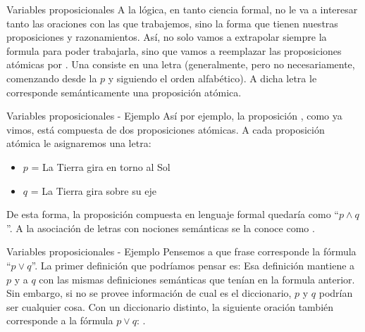 \begin{frame}{Variables proposicionales}
  A la lógica, en tanto ciencia formal, no le va a interesar tanto las oraciones
  con las que trabajemos, sino la forma que tienen nuestras proposiciones y
  razonamientos.
  \jump
  Así, no solo vamos a extrapolar siempre la formula para poder trabajarla, sino
  que vamos a reemplazar las proposiciones atómicas por .
  \jump
  Una  consiste en una letra (generalmente, pero
  no necesariamente, comenzando desde la $p$ y siguiendo el orden alfabético). A
  dicha letra le corresponde semánticamente una proposición atómica.
\end{frame}


\begin{frame}{Variables proposicionales - Ejemplo}
  Así por ejemplo, la proposición , como ya vimos, está compuesta de dos
  proposiciones atómicas. A cada proposición atómica le asignaremos una letra:
  \jump
  \begin{itemize}
    \item $p$ = La Tierra gira en torno al Sol
    \item $q$ = La Tierra gira sobre su eje
  \end{itemize}
  \jump
  De esta forma, la proposición compuesta en lenguaje formal quedaría como
  ``$p \land q$''.
  \jump
  A la asociación de letras con nociones semánticas se la conoce como .
\end{frame}


\begin{frame}{Variables proposicionales - Ejemplo}
  Pensemos a que frase corresponde la fórmula ``$p \lor q$''.
  \jump
  La primer definición que podríamos pensar es:
  \jump
  Esa definición mantiene a $p$ y a $q$ con las mismas definiciones semánticas
  que tenían en la formula anterior. Sin embargo, si no se provee información
  de cual es el diccionario, $p$ y $q$ podrían ser cualquier cosa.
  \jump
  Con un diccionario distinto, la siguiente oración también corresponde a la
  fórmula $p \lor q$: .
\end{frame}

